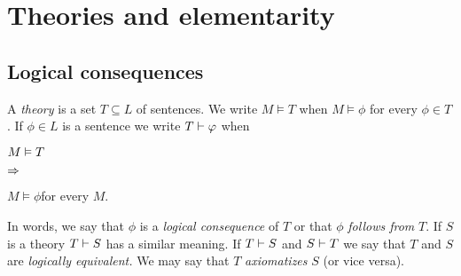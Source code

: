 \chapter{Theories and elementarity}
\label{teorie}

  
\def\medrel#1{\parbox[t]{6ex}{$\displaystyle\hfil #1$}}
\def\ceq#1#2#3{\parbox{15ex}{$\displaystyle #1$}\medrel{#2}$\displaystyle  #3$}

\section{Logical consequences}\label{conseguenzelogiche}
% 
% 
% 
% 
% 
% 

A \emph{theory\/} is a set $T\subseteq L$ of sentences.
We write \emph{$M\models T$\/} when $M\models\phi$ for every $\phi\in T$.
If $\phi\in L$ is a sentence we write \emph{$T\vdash\varphi$\/} when

\ceq{\hfill M\models T}{\IMP}{M\models\phi}\qquad for every $M$.

In words, we say that $\phi$ is a \emph{logical consequence\/} of $T$ or that $\phi$ \emph{follows from\/} $T$.
If $S$ is a theory \emph{$T\vdash S$\/} has a similar meaning.
If $T\vdash S$ and $S\vdash T$ we say that $T$ and $S$ are \emph{logically equivalent.}
We may say that $T$ \emph{axiomatizes\/} $S$ (or vice versa).


